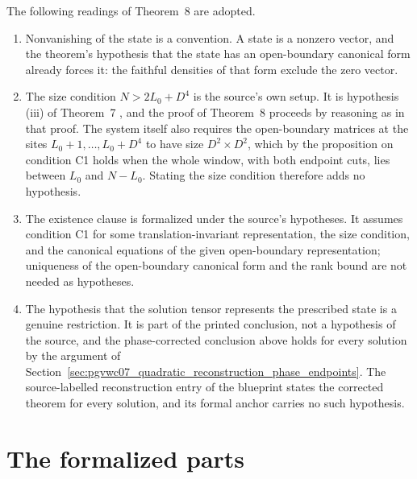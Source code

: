 \documentclass{article}
\begin{document}
The following readings of Theorem~8 are adopted.

\begin{enumerate}
    \item Nonvanishing of the state is a convention. A state is a nonzero
          vector, and the theorem's hypothesis that the state has an
          open-boundary canonical form already forces it: the faithful
          densities of that form exclude the zero vector.
    \item The size condition $N>2L_0+D^4$ is the source's own setup. It is
          hypothesis (iii) of Theorem~7 \cite[lines~1002--1015]{PerezGarcia2007Matrix},
          and the proof of Theorem~8 \cite[lines~1167--1176]{PerezGarcia2007Matrix}
          proceeds by reasoning as in that proof. The system itself
          \cite[lines~1139--1152]{PerezGarcia2007Matrix} also requires the
          open-boundary matrices at the sites $L_0+1,\ldots,L_0+D^4$ to have
          size $D^2\times D^2$, which by the proposition on condition C1
          \cite[lines~911--920]{PerezGarcia2007Matrix} holds when the whole
          window, with both endpoint cuts, lies between $L_0$ and $N-L_0$.
          Stating the size condition therefore adds no hypothesis.
    \item The existence clause is formalized under the source's hypotheses.
          It assumes condition C1 for some translation-invariant
          representation, the size condition, and the canonical equations of
          the given open-boundary representation; uniqueness of the
          open-boundary canonical form and the rank bound are not needed as
          hypotheses.
    \item The hypothesis that the solution tensor represents the prescribed
          state is a genuine restriction. It is part of the printed
          conclusion, not a hypothesis of the source, and the phase-corrected
          conclusion above holds for every solution by the argument of
          Section~\ref{sec:pgvwc07_quadratic_reconstruction_phase_endpoints}.
          The source-labelled reconstruction entry of the blueprint states the
          corrected theorem for every solution, and its formal anchor carries
          no such hypothesis.
\end{enumerate}

\section{The formalized parts}
\end{document}
